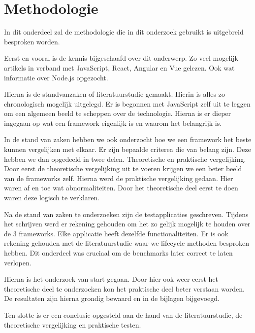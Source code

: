 
\chapter{Methodologie}
\label{ch:methodologie}

In dit onderdeel zal de methodologie die in dit onderzoek gebruikt is uitgebreid besproken worden. 

Eerst en vooral is de kennis bijgeschaafd over dit onderwerp. Zo veel mogelijk artikels in verband met JavaScript, React, Angular en Vue gelezen. Ook wat informatie over Node.js opgezocht.

Hierna is de standvanzaken of literatuurstudie gemaakt. Hierin is alles zo chronologisch mogelijk uitgelegd. Er is begonnen met JavaScript zelf uit te leggen om een algemeen beeld te scheppen over de technologie. Hierna is er dieper ingegaan op wat een framework eigenlijk is en waarom het belangrijk is.

In de stand van zaken hebben we ook onderzocht hoe we een framework het beste kunnen vergelijken met elkaar. Er zijn bepaalde criterea die van belang zijn. Deze hebben we dan opgedeeld in twee delen. Theoretische en praktische vergelijking. Door eerst de theoretische vergelijking uit te voeren krijgen we een beter beeld van de frameworks zelf. Hierna werd de praktische vergelijking gedaan. Hier waren af en toe wat abnormaliteiten. Door het theoretische deel eerst te doen waren deze logisch te verklaren.

Na de stand van zaken te onderzoeken zijn de testapplicaties geschreven. Tijdens het schrijven werd er rekening gehouden om het zo gelijk mogelijk te houden over de 3 frameworks. Elke applicatie heeft dezelfde functionaliteiten. Er is ook rekening gehouden met de literatuurstudie waar we lifecycle methoden besproken hebben. Dit onderdeel was cruciaal om de benchmarks later correct te laten verlopen.

Hierna is het onderzoek van start gegaan. Door hier ook weer eerst het theoretische deel te onderzoeken kon het praktische deel beter verstaan worden. De resultaten zijn hierna grondig bewaard en in de bijlagen bijgevoegd.

Ten slotte is er een conclusie opgesteld aan de hand van de literatuurstudie, de theoretische vergelijking en praktische testen.



